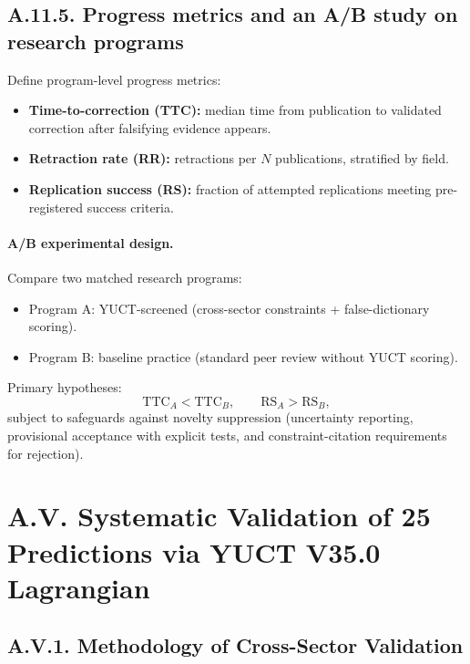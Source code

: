 \documentclass[13pt,a4paper]{article}
\begin{document}
	\subsection*{A.11.5. Progress metrics and an A/B study on research programs}
	Define program-level progress metrics:
	\begin{itemize}[leftmargin=*]
		\item \textbf{Time-to-correction (TTC):} median time from publication to validated correction after falsifying evidence appears.
		\item \textbf{Retraction rate (RR):} retractions per $N$ publications, stratified by field.
		\item \textbf{Replication success (RS):} fraction of attempted replications meeting pre-registered success criteria.
	\end{itemize}
	
	\paragraph{A/B experimental design.}
	Compare two matched research programs:
	\begin{itemize}[leftmargin=*]
		\item Program A: YUCT-screened (cross-sector constraints + false-dictionary scoring).
		\item Program B: baseline practice (standard peer review without YUCT scoring).
	\end{itemize}
	Primary hypotheses:
	$$
	\mathrm{TTC}_A < \mathrm{TTC}_B,\qquad \mathrm{RS}_A > \mathrm{RS}_B,
	$$
	subject to safeguards against novelty suppression (uncertainty reporting, provisional acceptance with explicit tests, and constraint-citation requirements for rejection).
	\section*{A.V. Systematic Validation of 25 Predictions via YUCT V35.0 Lagrangian}
	
	\subsection*{A.V.1. Methodology of Cross-Sector Validation}
	
\end{document}
